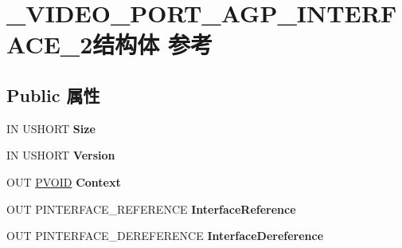 \hypertarget{struct___v_i_d_e_o___p_o_r_t___a_g_p___i_n_t_e_r_f_a_c_e__2}{}\section{\+\_\+\+V\+I\+D\+E\+O\+\_\+\+P\+O\+R\+T\+\_\+\+A\+G\+P\+\_\+\+I\+N\+T\+E\+R\+F\+A\+C\+E\+\_\+2结构体 参考}
\label{struct___v_i_d_e_o___p_o_r_t___a_g_p___i_n_t_e_r_f_a_c_e__2}
\subsection*{Public 属性}
\begin{DoxyCompactItemize}
\item 
\mbox{\label{struct___v_i_d_e_o___p_o_r_t___a_g_p___i_n_t_e_r_f_a_c_e__2_aafc8bae2dde9b74dd12c5377fed13fc9}} 
IN U\+S\+H\+O\+RT {\bfseries Size}
\item 
\mbox{\label{struct___v_i_d_e_o___p_o_r_t___a_g_p___i_n_t_e_r_f_a_c_e__2_a4f59c19c8c2d795978be21d91929fb01}} 
IN U\+S\+H\+O\+RT {\bfseries Version}
\item 
\mbox{\label{struct___v_i_d_e_o___p_o_r_t___a_g_p___i_n_t_e_r_f_a_c_e__2_ab4d2fa967727797b529a2df448c07fd8}} 
O\+UT \hyperlink{interfacevoid}{P\+V\+O\+ID} {\bfseries Context}
\item 
\mbox{\label{struct___v_i_d_e_o___p_o_r_t___a_g_p___i_n_t_e_r_f_a_c_e__2_aaa5b97c289581c4ba5bcb9e08f1aef1e}} 
O\+UT P\+I\+N\+T\+E\+R\+F\+A\+C\+E\+\_\+\+R\+E\+F\+E\+R\+E\+N\+CE {\bfseries Interface\+Reference}
\item 
\mbox{\label{struct___v_i_d_e_o___p_o_r_t___a_g_p___i_n_t_e_r_f_a_c_e__2_a4683c4a1ca91eab651a505431b19c57c}} 
O\+UT P\+I\+N\+T\+E\+R\+F\+A\+C\+E\+\_\+\+D\+E\+R\+E\+F\+E\+R\+E\+N\+CE {\bfseries Interface\+Dereference}
\item 
\mbox{\label{struct___v_i_d_e_o___p_o_r_t___a_g_p___i_n_t_e_r_f_a_c_e__2_a629f1da3ce75db7e822a6f4845c572e3}} 

\end{DoxyCompactItemize}
